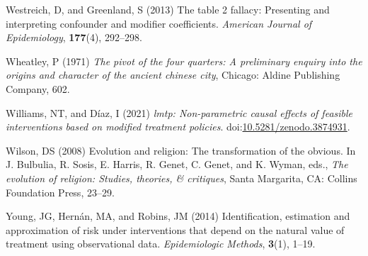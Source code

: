 \documentclass[
  single column]{article}
\newlength{\cslhangindent}
\newenvironment{CSLReferences}[2] %
 {\begin{list}{}{%
  \setlength{\itemindent}{0pt}
  \setlength{\leftmargin}{0pt}
  \setlength{\parsep}{0pt}
  \ifodd #1
   \setlength{\leftmargin}{\cslhangindent}
   \setlength{\itemindent}{-1\cslhangindent}
  \fi
  \setlength{\itemsep}{#2\baselineskip}}}
 {\end{list}}
\begin{document}
\begin{CSLReferences}{1}{0}
Westreich, D, and Greenland, S (2013) The table 2 fallacy: Presenting
and interpreting confounder and modifier coefficients. \emph{American
Journal of Epidemiology}, \textbf{177}(4), 292--298.

Wheatley, P (1971) \emph{The pivot of the four quarters: A preliminary
enquiry into the origins and character of the ancient chinese city},
Chicago: Aldine Publishing Company, 602.

Williams, NT, and Díaz, I (2021) \emph{{l}mtp: Non-parametric causal
effects of feasible interventions based on modified treatment policies}.
doi:\href{https://doi.org/10.5281/zenodo.3874931}{10.5281/zenodo.3874931}.

Wilson, DS (2008) Evolution and religion: The transformation of the
obvious. In J. Bulbulia, R. Sosis, E. Harris, R. Genet, C. Genet, and K.
Wyman, eds., \emph{The evolution of religion: Studies, theories, \&
critiques}, Santa Margarita, CA: Collins Foundation Press, 23--29.

Young, JG, Hernán, MA, and Robins, JM (2014) Identification, estimation
and approximation of risk under interventions that depend on the natural
value of treatment using observational data. \emph{Epidemiologic
Methods}, \textbf{3}(1), 1--19.

\end{CSLReferences}
\end{document}
